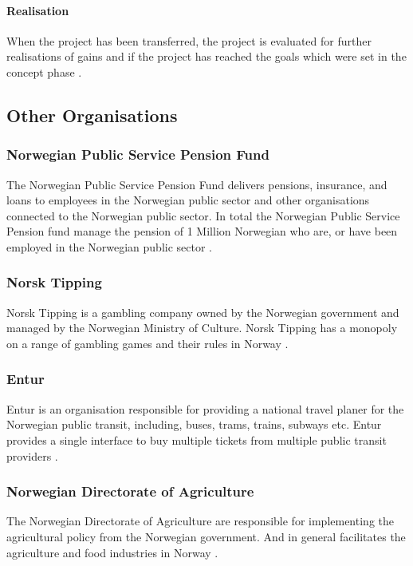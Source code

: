 \paragraph{Realisation}
When the project has been transferred, the project is evaluated for further realisations of gains and if the project has reached the goals which were set in the concept phase \cite{project_wizard_digdir_2023}.

\subsection{Other Organisations}
\subsubsection{Norwegian Public Service Pension Fund}
The Norwegian Public Service Pension Fund delivers pensions, insurance, and loans to employees in the Norwegian public sector and other organisations connected to the Norwegian public sector. In total the Norwegian Public Service Pension fund manage the pension of 1 Million Norwegian who are, or have been employed in the Norwegian public sector \cite{statens_pensjonskasse_2023}.

\subsubsection{Norsk Tipping}
Norsk Tipping is a gambling company owned by the Norwegian government and managed by the Norwegian Ministry of Culture. Norsk Tipping has a monopoly on a range of gambling games and their rules in Norway \cite{norsk_tipping_wiki_2023}.

\subsubsection{Entur}
Entur is an organisation responsible for providing a national travel planer for the Norwegian public transit, including, buses, trams, trains, subways etc. Entur provides a single interface to buy multiple tickets from multiple public transit providers \cite{entur_2023}.

\subsubsection{Norwegian Directorate of Agriculture}
The Norwegian Directorate of Agriculture are responsible for implementing the agricultural policy from the Norwegian government. And in general facilitates the agriculture and food industries in Norway \cite{landbruksdirektoratet_2023}.


